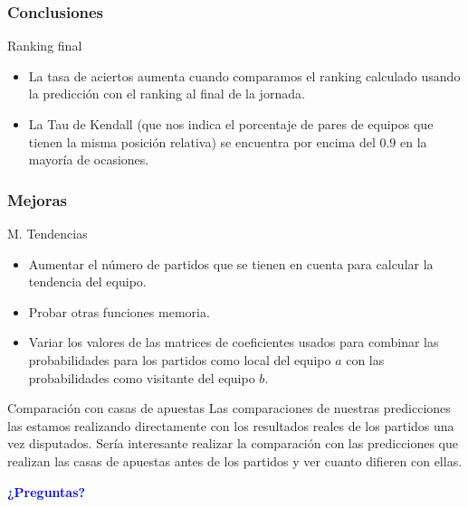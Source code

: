 \documentclass{beamer}
\begin{document}
	\begin{frame}
		\frametitle{Conclusiones}
		\begin{block}{Ranking final}
			\begin{itemize}
				\item La tasa de aciertos aumenta cuando comparamos el ranking calculado usando la predicción con el ranking al final de la jornada. 
				\item La Tau de Kendall (que nos indica el porcentaje de pares de equipos que tienen la misma posición relativa) se encuentra por encima del $0.9$ en la mayoría de ocasiones.
			\end{itemize}		
		\end{block}				
	\end{frame}	

	\begin{frame}
		\frametitle{Mejoras}
		\begin{block}{M. Tendencias}
			\begin{itemize}
				\item Aumentar el número de partidos que se tienen en cuenta para calcular la tendencia del equipo.
				\item Probar otras funciones memoria.
				\item Variar los valores de las matrices de coeficientes usados para combinar las probabilidades para los partidos como local del equipo $a$ con las probabilidades como visitante del equipo $b$. 
			\end{itemize}		
		\end{block}				
		\begin{block}{Comparación con casas de apuestas}
			Las comparaciones de nuestras predicciones las estamos realizando directamente con los resultados reales de los partidos una vez disputados. Sería interesante realizar la comparación con las predicciones que realizan las casas de apuestas antes de los partidos y ver cuanto difieren con ellas. 	
		\end{block}
	\end{frame}	

	\begin{frame}
		\begin{center}
			\Huge\textbf{\textsf{\textcolor{blue}{¿Preguntas?}}}
		\end{center}
	\end{frame}	
\end{document}
